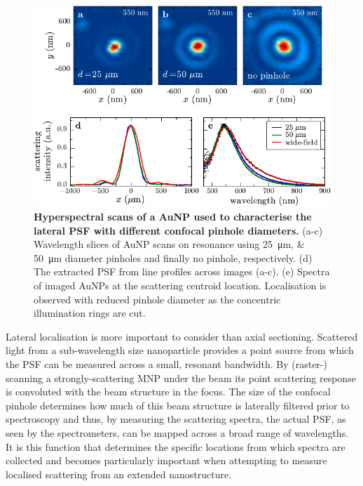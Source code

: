 \documentclass{article}
\begin{document}
\begin{figure}[bt]
\centering
\includegraphics{figures/lateral_aunp_scans}
\caption[Hyperspectral scans of a AuNP used to characterise the lateral PSF with different confocal pinhole diameters.]{\textbf{Hyperspectral scans of a AuNP used to characterise the lateral PSF with different confocal pinhole diameters.} (a-c) Wavelength slices of AuNP scans on resonance using \SIlist{25;50}{\micro\metre} diameter pinholes and finally no pinhole, respectively. (d) The extracted PSF from line profiles across  images (a-c). (e) Spectra of imaged AuNPs at the scattering centroid location. Localisation is observed with reduced pinhole diameter as the concentric illumination rings are cut.}
\label{fig:lateral_psf}
\end{figure}

Lateral localisation is more important to consider than axial sectioning. Scattered light from a sub-wavelength size nanoparticle provides a point source from which the PSF can be measured across a small, resonant bandwidth. By (raster-) scanning a strongly-scattering MNP under the beam its point scattering response is convoluted with the beam structure in the focus. The size of the confocal pinhole determines how much of this beam structure is laterally filtered prior to spectroscopy and thus, by measuring the scattering spectra, the actual PSF, as seen by the spectrometers, can be mapped across a broad range of wavelengths. It is this function that determines the specific locations from which spectra are collected and becomes particularly important when attempting to measure localised scattering from an extended nanostructure.
\end{document}
